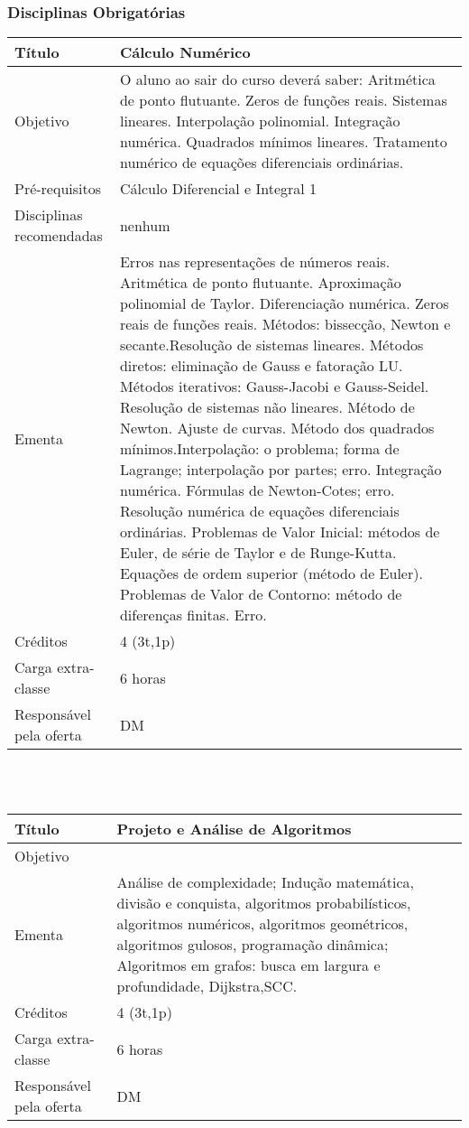 \subsubsection{Disciplinas Obrigatórias}


\begin{tabular}{|p{4.5cm}|p{10.0cm}|} \hline
Título & Cálculo Numérico \\ \hline
Objetivo &  O aluno ao sair do curso deverá saber: Aritmética de ponto flutuante. Zeros de funções reais. Sistemas lineares. Interpolação polinomial. Integração numérica. Quadrados mínimos lineares. Tratamento numérico de equações diferenciais ordinárias.  \\ \hline
Pré-requisitos & Cálculo Diferencial e Integral 1 \\ \hline
Disciplinas recomendadas & nenhum \\ \hline
Ementa &   Erros nas representações de números reais. Aritmética de ponto flutuante. Aproximação polinomial de Taylor. Diferenciação numérica.   Zeros reais de funções reais. Métodos: bissecção, Newton e secante.Resolução de sistemas lineares. Métodos diretos: eliminação de Gauss e fatoração LU. Métodos iterativos: Gauss-Jacobi e Gauss-Seidel.  Resolução de sistemas não lineares. Método de Newton. Ajuste de curvas. Método dos quadrados mínimos.Interpolação: o problema; forma de Lagrange; interpolação por partes; erro.   Integração numérica. Fórmulas de Newton-Cotes; erro.  Resolução numérica de equações diferenciais ordinárias. Problemas de Valor Inicial: métodos de Euler, de série de Taylor e de Runge-Kutta. Equações de ordem superior (método de Euler). Problemas de Valor de Contorno: método de diferenças finitas. Erro.
 \\ \hline
Créditos & 4 (3t,1p) \\ \hline
Carga extra-classe & 6 horas \\ \hline
Responsável pela oferta & DM \\ \hline
\end{tabular}
\\
\\



\begin{tabular}{|p{4.5cm}|p{10.0cm}|} \hline
Título & Projeto e Análise de Algoritmos \\ \hline

Objetivo &   \\ \hline
Ementa & Análise de complexidade; Indução matemática, divisão e conquista, algoritmos probabilísticos, algoritmos numéricos, algoritmos geométricos, algoritmos gulosos, programação dinâmica; Algoritmos em grafos: busca em largura e profundidade, Dijkstra,SCC.    \\ \hline
Créditos & 4 (3t,1p) \\ \hline
Carga extra-classe & 6 horas \\ \hline
Responsável pela oferta & DM \\ \hline
\end{tabular}



